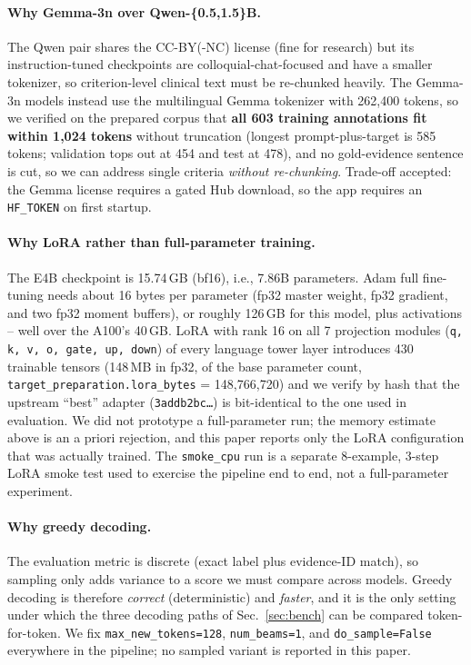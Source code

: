 \documentclass[conference]{IEEEtran}
\newcommand{\code}[1]{\texttt{\small #1}}
\begin{document}
\paragraph*{Why Gemma-3n over Qwen-\{0.5,1.5\}B.}
The Qwen pair shares the CC-BY(-NC) license (fine for
research) but its instruction-tuned checkpoints are
colloquial-chat-focused and have a smaller tokenizer, so
criterion-level clinical text must be re-chunked heavily. The
Gemma-3n models instead use the multilingual Gemma tokenizer with
262{,}400 tokens, so we verified on the prepared corpus that
\textbf{all 603 training annotations fit within 1{,}024 tokens}
without truncation (longest prompt-plus-target is 585 tokens;
validation tops out at 454 and test at 478), and no gold-evidence
sentence is cut, so we can address single criteria
\emph{without re-chunking}. Trade-off accepted:
the Gemma license requires a gated Hub download, so the app
requires an \code{HF\_TOKEN} on first startup.

\paragraph*{Why LoRA rather than full-parameter training.}
The E4B checkpoint is 15.74\,GB (bf16), i.e., 7.86B parameters.
Adam full fine-tuning needs about 16 bytes per parameter (fp32
master weight, fp32 gradient, and two fp32 moment buffers), or
roughly 126\,GB for this model, plus activations -- well over the
A100's 40\,GB. LoRA with rank 16 on all 7
projection modules
(\code{q, k, v, o, gate, up, down}) of every language tower layer
introduces 430 trainable tensors
(148\,MB in fp32,  of the base parameter count,
\code{target\_preparation.lora\_bytes} = 148{,}766{,}720) and we
verify by hash that the upstream ``best'' adapter
(\code{3addb2bc\dots}) is bit-identical to the one used in
evaluation. We did not prototype a full-parameter run; the
memory estimate above is an a priori rejection, and this paper
reports only the LoRA configuration that was actually trained.
The \code{smoke\_cpu} run is a separate 8-example, 3-step LoRA
smoke test used to exercise the pipeline end to end, not a
full-parameter experiment.

\paragraph*{Why greedy decoding.}
The evaluation metric is discrete (exact label plus evidence-ID
match), so sampling only adds variance to a score we must compare
across models. Greedy decoding is therefore \emph{correct}
(deterministic) and \emph{faster}, and it is the only setting under
which the three decoding paths of Sec.~\ref{sec:bench} can be
compared token-for-token. We fix
\code{max\_new\_tokens=128}, \code{num\_beams=1}, and
\code{do\_sample=False} everywhere in the pipeline; no sampled
variant is reported in this paper.
\end{document}
